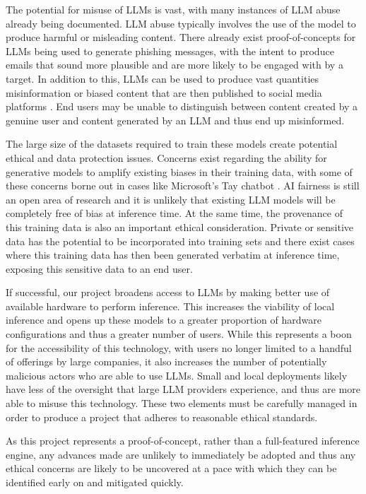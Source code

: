 \documentclass[12pt,twoside]{report}
\begin{document}
The potential for misuse of LLMs is vast, with many instances of LLM abuse already being documented.
LLM abuse typically involves the use of the model to produce harmful or misleading content.
There already exist proof-of-concepts for LLMs \cite{hazell2023spear} being used to generate phishing messages, with the intent to produce emails that sound more plausible and are more likely to be engaged with by a target.
In addition to this, LLMs can be used to produce vast quantities misinformation or biased content that are then published to social media platforms \cite{williams2024large}. 
End users may be unable to distinguish between content created by a genuine user and content generated by an LLM and thus end up misinformed.

The large size of the datasets required to train these models create potential ethical and data protection issues.
Concerns exist regarding the ability for generative models to amplify existing biases in their training data, with some of these concerns borne out in cases like Microsoft's Tay chatbot \cite{tayMicrosoft}.
AI fairness is still an open area of research \cite{xivuri2021systematic} and it is unlikely that existing LLM models will be completely free of bias at inference time.
At the same time, the provenance of this training data is also an important ethical consideration.
Private or sensitive data has the potential to be incorporated into training sets and there exist cases \cite{nasr2023scalable} where this training data has then been generated verbatim at inference time, exposing this sensitive data to an end user.

If successful, our project broadens access to LLMs by making better use of available hardware to perform inference.
This increases the viability of local inference and opens up these models to a greater proportion of hardware configurations and thus a greater number of users.
While this represents a boon for the accessibility of this technology, with users no longer limited to a handful of offerings by large companies, it also increases the number of potentially malicious actors who are able to use LLMs.
Small and local deployments likely have less of the oversight that large LLM providers experience, and thus are more able to misuse this technology.
These two elements must be carefully managed in order to produce a project that adheres to reasonable ethical standards.

As this project represents a proof-of-concept, rather than a full-featured inference engine, any advances made are unlikely to immediately be adopted and thus any ethical concerns are likely to be uncovered at a pace with which they can be identified early on and mitigated quickly.




\end{document}

